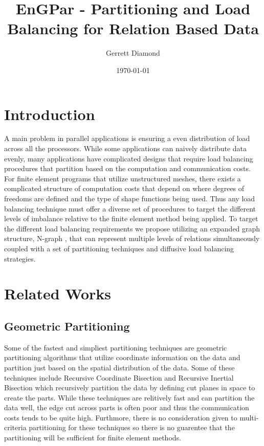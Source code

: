 \documentclass[a4paper]{article}
\title{EnGPar - Partitioning and Load Balancing for Relation Based Data}
\author{Gerrett Diamond}
\date{\today}
\begin{document}
\maketitle

\section{Introduction}
A main problem in parallel applications is ensuring a even distribution of load across all the processors. While some applications can naively distribute data evenly, many applications have complicated designs that require load balancing procedures that partition based on the computation and communication costs. For finite element programs that utilize unstructured meshes, there exists a complicated structure of computation costs that depend on where degrees of freedoms are defined and the type of shape functions being used. Thus any load balancing technique must offer a diverse set of procedures to target the different levels of imbalance relative to the finite element method being applied. To target the different load balancing requirements we propose utilizing an expanded graph structure, N-graph \cite{EnGPar2015proposal}, that can represent multiple levels of relations simultaneously coupled with a set of partitioning techniques and diffusive load balancing strategies.

\section{Related Works}

\subsection{Geometric Partitioning}
Some of the fastest and simpliest partitioning techniques are geometric partitioning algorithms that utilize coordinate information on the data and partition just based on the spatial distribution of the data. Some of these techniques include Recursive Coordinate Bisection and Recursive Inertial Bisection \cite{chevalier2012load,TaylorRIB,williamsRIB} which recursively partition the data by defining cut planes in space to create the parts. While these techniques are relitively fast and can partition the data well, the edge cut across parts is often poor and thus the communication costs tends to be quite high. Furthmore, there is no consideration given to multi-criteria partitioning for these techniques so there is no guarentee that the partitioning will be sufficient for finite element methods.
\end{document}
